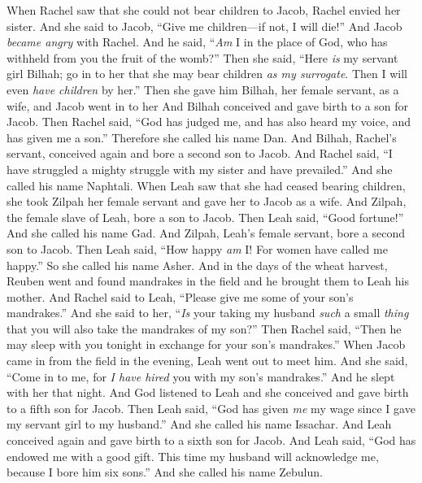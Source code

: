 \begin{biblechapter} %
 When Rachel saw that she could not bear children to Jacob, Rachel envied her sister. And she said to Jacob, “Give me children—if not, I will die!”
\verse And Jacob \textit{became angry} with Rachel. And he said, “\textit{Am} I in the place of God, who has withheld from you the fruit of the womb?”
\verse Then she said, “Here \textit{is} my servant girl Bilhah; go in to her that she may bear children \textit{as my surrogate}. Then I will even \textit{have children} by her.”
\verse Then she gave him Bilhah, her female servant, as a wife, and Jacob went in to her
\verse And Bilhah conceived and gave birth to a son for Jacob.
\verse Then Rachel said, “God has judged me, and has also heard my voice, and has given me a son.” Therefore she called his name Dan.
\verse And Bilhah, Rachel’s servant, conceived again and bore a second son to Jacob.
\verse And Rachel said, “I have struggled a mighty struggle with my sister and have prevailed.” And she called his name Naphtali.
\verse When Leah saw that she had ceased bearing children, she took Zilpah her female servant and gave her to Jacob as a wife.
\verse And Zilpah, the female slave of Leah, bore a son to Jacob.
\verse Then Leah said, “Good fortune!” And she called his name Gad.
\verse And Zilpah, Leah’s female servant, bore a second son to Jacob.
\verse Then Leah said, “How happy \textit{am} I! For women have called me happy.” So she called his name Asher.
\verse And in the days of the wheat harvest, Reuben went and found mandrakes in the field and he brought them to Leah his mother. And Rachel said to Leah, “Please give me some of your son’s mandrakes.”
\verse And she said to her, “\textit{Is} your taking my husband \textit{such} a small \textit{thing} that you will also take the mandrakes of my son?” Then Rachel said, “Then he may sleep with you tonight in exchange for your son’s mandrakes.”
\verse When Jacob came in from the field in the evening, Leah went out to meet him. And she said, “Come in to me, for \textit{I have hired} you with my son’s mandrakes.” And he slept with her that night.
\verse And God listened to Leah and she conceived and gave birth to a fifth son for Jacob.
\verse Then Leah said, “God has given \textit{me} my wage since I gave my servant girl to my husband.” And she called his name Issachar.
\verse And Leah conceived again and gave birth to a sixth son for Jacob.
\verse And Leah said, “God has endowed me with a good gift. This time my husband will acknowledge me, because I bore him six sons.” And she called his name Zebulun.

\end{biblechapter}
